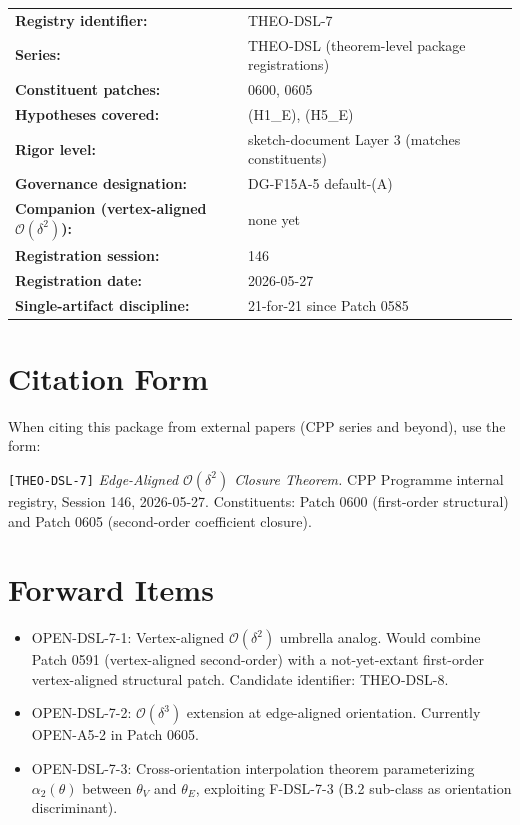 \documentclass[11pt]{article}
\begin{document}
\begin{center}
\begin{tabular}{ll}
\hline
\textbf{Registry identifier:} & THEO-DSL-7 \\
\textbf{Series:} & THEO-DSL (theorem-level package registrations) \\
\textbf{Constituent patches:} & 0600, 0605 \\
\textbf{Hypotheses covered:} & (H1\_E), (H5\_E) \\
\textbf{Rigor level:} & sketch-document Layer 3 (matches constituents) \\
\textbf{Governance designation:} & DG-F15A-5 default-(A) \\
\textbf{Companion (vertex-aligned $\mathcal{O}(\delta^2)$):} & none yet
\\
\textbf{Registration session:} & 146 \\
\textbf{Registration date:} & 2026-05-27 \\
\textbf{Single-artifact discipline:} & 21-for-21 since Patch 0585 \\
\hline
\end{tabular}
\end{center}

\section{Citation Form}

When citing this package from external papers (CPP series and beyond),
use the form:

\medskip
\noindent\texttt{[THEO-DSL-7]} \emph{Edge-Aligned $\mathcal{O}(\delta^2)$
Closure Theorem.} CPP Programme internal registry, Session 146,
2026-05-27. Constituents: Patch 0600 (first-order structural) and
Patch 0605 (second-order coefficient closure).

\section{Forward Items}

\begin{itemize}
\item OPEN-DSL-7-1: Vertex-aligned $\mathcal{O}(\delta^2)$ umbrella
analog. Would combine Patch 0591 (vertex-aligned second-order) with a
not-yet-extant first-order vertex-aligned structural patch. Candidate
identifier: THEO-DSL-8.
\item OPEN-DSL-7-2: $\mathcal{O}(\delta^3)$ extension at edge-aligned
orientation. Currently OPEN-A5-2 in Patch 0605.
\item OPEN-DSL-7-3: Cross-orientation interpolation theorem
parameterizing $\alpha_2(\theta)$ between $\theta_V$ and $\theta_E$,
exploiting F-DSL-7-3 (B.2 sub-class as orientation discriminant).
\end{itemize}
\end{document}
